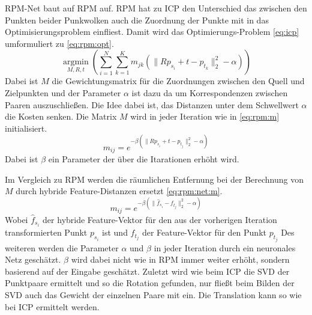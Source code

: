 \documentclass[12pt,titlepage, twoside]{article}
\begin{document}

RPM-Net baut auf RPM \cite{RPM} auf. RPM hat zu ICP den Unterschied das zwischen den Punkten beider Punkwolken auch die Zuordnung der Punkte mit in das Optimisierungsproblem einfliest.
Damit wird das Optimierungs-Problem \ref{eq:icp} umformuliert zu \ref{eq:rpm:opt}.
\begin{equation}
    \label{eq:rpm:opt}
    \underset{M,R,t}{\operatorname{argmin}}(\sum_{i=1}^N\sum_{k=1}^K{m_{jk}(\|Rp_{s_i} + t - p_{t_k}\|_2^2-\alpha)})
\end{equation}
Dabei ist $M$ die Gewichtungsmatrix für die Zuordnungen zwischen den Quell und Zielpunkten und der Parameter $\alpha$ ist dazu da um Korrespondenzen zwischen Paaren auszuschließen. 
Die Idee dabei ist, das Distanzen unter dem Schwellwert $\alpha$ die Kosten senken.
Die Matrix $M$ wird in jeder Iteration wie in \ref{eq:rpm:m} initialisiert.
\begin{equation}
    \label{eq:rpm:m}
    m_{ij} = e^{-\beta(\|Rp_{s_i} + t - p_{t_j}\|_2^2-\alpha)}
\end{equation}
Dabei ist $\beta$ ein Parameter der über die Itarationen erhöht wird.

Im Vergleich zu RPM werden die räumlichen Entfernung bei der Berechnung von $M$ durch hybride Feature-Distanzen ersetzt \ref{eq:rpm:net:m}.
\begin{equation}
    \label{eq:rpm:net:m}
    m_{ij} = e^{-\beta(\|\hat{f}_{s_i} - f_{t_j}\|_2^2-\alpha)}
\end{equation}
Wobei $\hat{f}_{s_i}$ der hybride Feature-Vektor für den aus der vorherigen Iteration transformierten Punkt $p_{s_i}$ ist und $f_{t_j}$ der Feature-Vektor für den Punkt $p_{t_j}$
Des weiteren werden die Parameter $\alpha$ und $\beta$ in jeder Iteration durch ein neuronales Netz geschätzt. 
$\beta$ wird dabei nicht wie in RPM immer weiter erhöht, sondern basierend auf der Eingabe geschätzt.
Zuletzt wird wie beim ICP die SVD der Punktpaare ermittelt und so die Rotation gefunden, nur fließt beim Bilden der SVD auch das Gewicht der einzelnen Paare mit ein. 
Die Translation kann so wie bei ICP ermittelt werden. 
\end{document}
